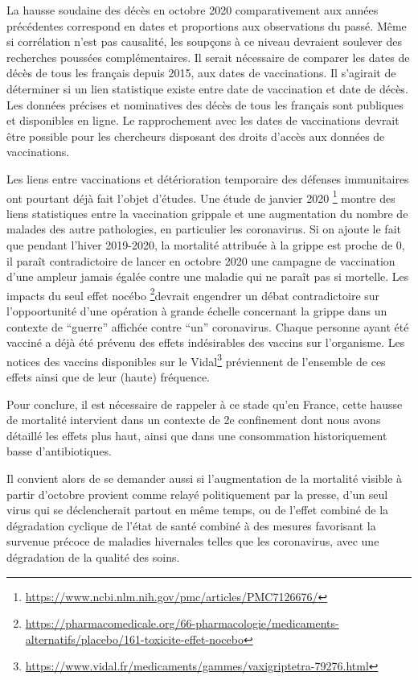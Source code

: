 \documentclass[
]{article}
\begin{document}
La hausse soudaine des décès en octobre 2020 comparativement aux années
précédentes correspond en dates et proportions aux observations du
passé. Même si corrélation n'est pas causalité, les soupçons à ce niveau
devraient soulever des recherches poussées complémentaires. Il serait
nécessaire de comparer les dates de décès de tous les français depuis
2015, aux dates de vaccinations. Il s'agirait de déterminer si un lien
statistique existe entre date de vaccination et date de décès. Les
données précises et nominatives des décès de tous les français sont
publiques et disponibles en ligne. Le rapprochement avec les dates de
vaccinations devrait être possible pour les chercheurs disposant des
droits d'accès aux données de vaccinations.

Les liens entre vaccinations et détérioration temporaire des défenses
immunitaires ont pourtant déjà fait l'objet d'études. Une étude de
janvier 2020 \footnote{\url{https://www.ncbi.nlm.nih.gov/pmc/articles/PMC7126676/}}
montre des liens statistiques entre la vaccination grippale et une
augmentation du nombre de malades des autre pathologies, en particulier
les coronavirus. Si on ajoute le fait que pendant l'hiver 2019-2020, la
mortalité attribuée à la grippe est proche de 0, il paraît
contradictoire de lancer en octobre 2020 une campagne de vaccination
d'une ampleur jamais égalée contre une maladie qui ne paraît pas si
mortelle. Les impacts du seul effet nocébo \footnote{\url{https://pharmacomedicale.org/66-pharmacologie/medicaments-alternatifs/placebo/161-toxicite-effet-nocebo}}devrait
engendrer un débat contradictoire sur l'oppoortunité d'une opération à
grande échelle concernant la grippe dans un contexte de ``guerre''
affichée contre ``un'' coronavirus. Chaque personne ayant été vacciné a
déjà été prévenu des effets indésirables des vaccins sur l'organisme.
Les notices des vaccins disponibles sur le Vidal\footnote{\url{https://www.vidal.fr/medicaments/gammes/vaxigriptetra-79276.html}}
préviennent de l'ensemble de ces effets ainsi que de leur (haute)
fréquence.

Pour conclure, il est nécessaire de rappeler à ce stade qu'en France,
cette hausse de mortalité intervient dans un contexte de 2e confinement
dont nous avons détaillé les effets plus haut, ainsi que dans une
consommation historiquement basse d'antibiotiques.

Il convient alors de se demander aussi si l'augmentation de la mortalité
visible à partir d'octobre provient comme relayé politiquement par la
presse, d'un seul virus qui se déclencherait partout en même temps, ou
de l'effet combiné de la dégradation cyclique de l'état de santé combiné
à des mesures favorisant la survenue précoce de maladies hivernales
telles que les coronavirus, avec une dégradation de la qualité des
soins.
\end{document}
